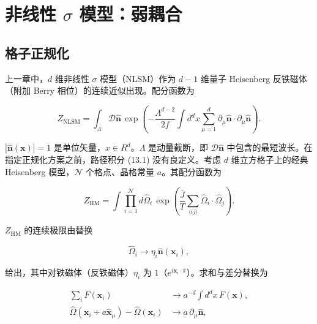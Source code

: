 \chapter{非线性 $\sigma$ 模型：弱耦合}

\section{格子正规化}

上一章中，$d$ 维非线性 {$\sigma$} 模型（NLSM）作为 $d-1$ 维量子 Heisenberg 反铁磁体（附加 Berry 相位）的连续近似出现。配分函数为

\begin{equation*}
Z_{\mathrm{NLSM}} = \int_{\Lambda} \mathcal {D} \hat {\mathbf {n}} \, \exp \left( - \frac {\Lambda^ {d - 2}}{2 f} \int d ^ {d} x \sum_ {\mu = 1} ^ {d} \partial_ {\mu} \hat {\mathbf {n}} \cdot \partial_ {\mu} \hat {\mathbf {n}} \right).
\tag{13.1}
\end{equation*}

$|\hat{\mathbf{n}}(\mathbf{x})|=1$ 是单位矢量，$x\in R^{d}$。$\Lambda$ 是动量截断，即 $\mathcal{D}\hat{\mathbf{n}}$ 中包含的最短波长。在指定正规化方案之前，路径积分 (13.1) 没有良定义。考虑 $d$ 维立方格子上的经典 Heisenberg 模型，$\mathcal{N}$ 个格点、晶格常量 $a$。其配分函数为

\begin{equation*}
Z_{\mathrm{HM}} = \int \prod_ {i = 1} ^ {\mathcal {N}} d \hat {\Omega} _ {i} \, \exp \left( \frac {\bar {J}}{T} \sum_{\langle ij \rangle} \hat {\Omega} _ {i} \cdot \hat {\Omega} _ {j} \right).
\tag{13.2}
\end{equation*}

$Z_{\mathrm{HM}}$ 的连续极限由替换

\begin{equation*}
\hat {\Omega} _ {i} \rightarrow \eta_ {i} \hat {\mathbf {n}} ( \mathbf {x} _ {i} ) ,
\tag{13.3}
\end{equation*}

给出，其中对铁磁体（反铁磁体）$\eta_{i}$ 为 $1$（$e^{i\mathbf{x}_{i}\cdot\bar{\pi}}$）。求和与差分替换为

\begin{align*}
\sum_ {i} F ( \mathbf {x} _ {i} ) & \rightarrow a ^ {- d} \int d ^ {d} x \, F ( \mathbf {x} ) ,\\
\hat {\Omega} ( \mathbf {x} _ {i} + a \hat {\boldsymbol {x}} _ {\mu} ) - \hat {\Omega} ( \mathbf {x} _ {i} ) & \rightarrow a \, \partial_ {\mu} \hat {\mathbf {n}} ,
\tag{13.4}
\end{align*}

